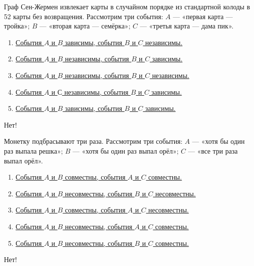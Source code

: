 \documentclass[t]{beamer}
\begin{document}
 \begin{frame} \label{1-No} 
\begin{block}{1} 

  Граф Сен-Жермен извлекает карты в случайном порядке из стандартной колоды в 52 карты без возвращения. Рассмотрим три события: $A$ — «первая карта — тройка»; $B$ — «вторая карта — семёрка»; $C$ — «третья карта — дама пик».
  


 \end{block} 
\begin{enumerate} 
\item[] \hyperlink{1-No}{\beamergotobutton{} События $A$ и $B$ зависимы, события $B$ и $C$ независимы.}
\item[] \hyperlink{1-No}{\beamergotobutton{} События $A$ и $B$ независимы, события $B$ и $C$ зависимы.}
\item[] \hyperlink{1-No}{\beamergotobutton{} События $A$ и $B$ независимы, события $B$ и $C$ независимы.}
\item[] \hyperlink{1-No}{\beamergotobutton{} События $A$ и $С$ независимы, события $B$ и $C$ зависимы.}
\item[] \hyperlink{1-Yes}{\beamergotobutton{} События $A$ и $B$ зависимы, события $B$ и $C$ зависимы.}
\end{enumerate} 

 \alert{Нет!} 
\end{frame} 


 \begin{frame} \label{2-No} 
\begin{block}{2} 

Монетку подбрасывают три раза. Рассмотрим три события: $A$ — «хотя бы один раз выпала решка»; $B$ — «хотя бы один раз выпал орёл»; $C$ — «все три раза выпал орёл».
  


 \end{block} 
\begin{enumerate} 
\item[] \hyperlink{2-No}{\beamergotobutton{} События $A$ и $B$ совместны, события $A$ и $C$ совместны.}
\item[] \hyperlink{2-No}{\beamergotobutton{} События $A$ и $B$ несовместны, события $B$ и $C$ несовместны.}
\item[] \hyperlink{2-Yes}{\beamergotobutton{} События $A$ и $B$ совместны, события $A$ и $C$ несовместны.}
\item[] \hyperlink{2-No}{\beamergotobutton{} События $A$ и $B$ несовместны, события $A$ и $C$ совместны.}
\item[] \hyperlink{2-No}{\beamergotobutton{} События $A$ и $B$ несовместны, события $B$ и $C$ совместны.}
\end{enumerate} 

 \alert{Нет!} 
\end{frame} 
\end{document}
